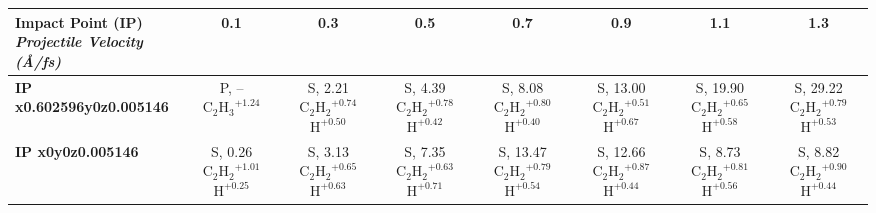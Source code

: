 \begin{table}[t]
\centering
\renewcommand{\arraystretch}{1.2}
\setcellgapes{2pt}\makegapedcells
\begin{tabular}{lccccccc}
\toprule
\makecell{\textbf{Impact Point (IP)}\\\textit{Projectile Velocity (\AA/fs)}} & \textbf{0.1} & \textbf{0.3} & \textbf{0.5} & \textbf{0.7} & \textbf{0.9} & \textbf{1.1} & \textbf{1.3} \\
\midrule
\arrayrulecolor[gray]{0.75}
\textbf{IP x0.602596y0z0.005146} & \makecell{P, -- \\ $\mathrm{C_2H_3}^{+1.24}$} & \makecell{S, 2.21 \\ $\mathrm{C_2H_2}^{+0.74}$ \\ $\mathrm{H}^{+0.50}$} & \makecell{S, 4.39 \\ $\mathrm{C_2H_2}^{+0.78}$ \\ $\mathrm{H}^{+0.42}$} & \makecell{S, 8.08 \\ $\mathrm{C_2H_2}^{+0.80}$ \\ $\mathrm{H}^{+0.40}$} & \makecell{S, 13.00 \\ $\mathrm{C_2H_2}^{+0.51}$ \\ $\mathrm{H}^{+0.67}$} & \makecell{S, 19.90 \\ $\mathrm{C_2H_2}^{+0.65}$ \\ $\mathrm{H}^{+0.58}$} & \makecell{S, 29.22 \\ $\mathrm{C_2H_2}^{+0.79}$ \\ $\mathrm{H}^{+0.53}$} \\
\midrule
\textbf{IP x0y0z0.005146} & \makecell{S, 0.26 \\ $\mathrm{C_2H_2}^{+1.01}$ \\ $\mathrm{H}^{+0.25}$} & \makecell{S, 3.13 \\ $\mathrm{C_2H_2}^{+0.65}$ \\ $\mathrm{H}^{+0.63}$} & \makecell{S, 7.35 \\ $\mathrm{C_2H_2}^{+0.63}$ \\ $\mathrm{H}^{+0.71}$} & \makecell{S, 13.47 \\ $\mathrm{C_2H_2}^{+0.79}$ \\ $\mathrm{H}^{+0.54}$} & \makecell{S, 12.66 \\ $\mathrm{C_2H_2}^{+0.87}$ \\ $\mathrm{H}^{+0.44}$} & \makecell{S, 8.73 \\ $\mathrm{C_2H_2}^{+0.81}$ \\ $\mathrm{H}^{+0.56}$} & \makecell{S, 8.82 \\ $\mathrm{C_2H_2}^{+0.90}$ \\ $\mathrm{H}^{+0.44}$} \\

\end{tabular}
\end{table}
